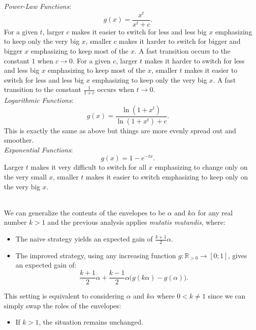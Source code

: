 \begin{solution}
    \textit{Power-Law Functions}:
    \[
        g\left(x\right) = \frac{x^t}{x^t + c}.
    \]
    For a given \( t \), larger \( c \) makes it easier to switch for less and less big \( x \) emphasizing to keep only the very big \( x \), smaller \( c \) makes it harder to switch for bigger and bigger \( x \) emphasizing to keep most of the \( x \). A fast transition occurs to the constant \( 1 \) when \( c\to 0 \). For a given \( c \), larger \( t \) makes it harder to switch for less and less big \( x \) emphasizing to keep most of the \( x \), smaller \( t \) makes it easier to switch for less and less big \( x \) emphasizing to keep only the very big \( x \). A fast transition to the constant \( \frac{1}{1+c} \) occurs when \( t\to 0 \). \\
    \textit{Logarithmic Functions}:
    \[
        g\left(x\right) = \frac{\ln\left(1 + x^t\right)}{\ln\left(1 + x^t\right) + c}.
    \]
    This is exactly the same as above but things are more evenly spread out and smoother. \\
    \textit{Exponential Functions}:
    \[
        g\left(x\right) = 1 - e^{-t x}.
    \]
    Larger \( t \) makes it very difficult to switch for all \( x \) emphasizing to change only on the very small \( x \), smaller \( t \) makes it easier to switch emphasizing to keep only on the very big \( x \).
    \\\\
    \begin{remark}
        We can generalize the contents of the envelopes to be \( \alpha \) and \( k\alpha \) for any real number \( k > 1 \) and the previous analysis applies \textit{mutatis mutandis}, where:
        \begin{itemize}
            \item The naive strategy yields an expected gain of \( \frac{k+1}{2}\alpha \).
            \item The improved strategy, using any increasing function \( g \colon \mathbb{R}_{>0} \to \left[0;1\right] \), gives an expected gain of:
                \[
                    \frac{k+1}{2}\alpha + \frac{k-1}{2}\alpha\bigl(g\left(k\alpha\right) - g\left(\alpha\right)\bigr).
                \]
        \end{itemize}
        This setting is equivalent to considering \( \alpha \) and \( k\alpha \) where \( 0 < k \neq 1 \) since we can simply swap the roles of the envelopes:
        \begin{itemize}
            \item If \( k > 1 \), the situation remains unchanged.

\end{itemize}
\end{remark}
\end{solution}
